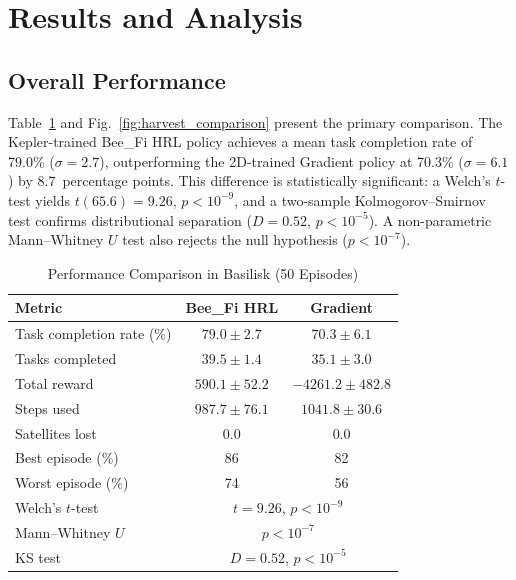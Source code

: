\documentclass[conference]{IEEEtran}
\begin{document}
\section{Results and Analysis}
\label{sec:results}

\subsection{Overall Performance}

Table~\ref{tab:results} and Fig.~\ref{fig:harvest_comparison} present the primary comparison. The Kepler-trained Bee\_Fi HRL policy achieves a mean task completion rate of 79.0\% ($\sigma = 2.7$), outperforming the 2D-trained Gradient policy at 70.3\% ($\sigma = 6.1$) by 8.7~percentage points. This difference is statistically significant: a Welch's $t$-test yields $t(65.6) = 9.26$, $p < 10^{-9}$, and a two-sample Kolmogorov--Smirnov test confirms distributional separation ($D = 0.52$, $p < 10^{-5}$). A non-parametric Mann--Whitney $U$ test also rejects the null hypothesis ($p < 10^{-7}$).

\begin{table}[t]
\centering
\caption{Performance Comparison in Basilisk (50 Episodes)}
\label{tab:results}
\begin{tabular}{@{}lcc@{}}
\toprule
\textbf{Metric} & \textbf{Bee\_Fi HRL} & \textbf{Gradient} \\
\midrule
Task completion rate (\%) & $\mathbf{79.0 \pm 2.7}$ & $70.3 \pm 6.1$ \\
Tasks completed & $39.5 \pm 1.4$ & $35.1 \pm 3.0$ \\
Total reward & $590.1 \pm 52.2$ & $-4261.2 \pm 482.8$ \\
Steps used & $987.7 \pm 76.1$ & $1041.8 \pm 30.6$ \\
Satellites lost & 0.0 & 0.0 \\
Best episode (\%) & 86 & 82 \\
Worst episode (\%) & 74 & 56 \\
\midrule
Welch's $t$-test & \multicolumn{2}{c}{$t = 9.26$, $p < 10^{-9}$} \\
Mann--Whitney $U$ & \multicolumn{2}{c}{$p < 10^{-7}$} \\
KS test & \multicolumn{2}{c}{$D = 0.52$, $p < 10^{-5}$} \\
\bottomrule
\end{tabular}
\end{table}
\end{document}
